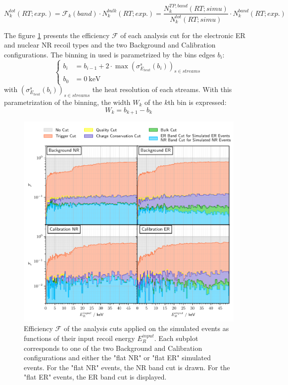 \begin{equation}
\label{eq:efficiency-correction}
N_k^{tot} (RT; exp.)
=
\mathcal{F}_k (band) \cdot N_k^{bulk} (RT; exp.)
=
\frac{ N_k^{TP, band} (RT; simu)}{ N_k^{tot} (RT; simu)} \cdot N_k^{band} (RT; exp.)
\end{equation}

The figure \ref{fig:cut-efficiency} presents the efficiency $\mathcal{F}$ of each analysis cut for the electronic ER and nuclear NR recoil types and the two Background and Calibration configurations. The binning in used is parametrized by the bins edges $b_i$:
\begin{equation}
\label{eq:bins-edges}
\begin{cases}
b_i &= b_{i-1} + 2 \cdot \max \left(\sigma_{E_{heat}}^s(b_i) \right)_{s \in streams}
\\
b_0 &= \SI{0}{\kilo\eV}
\end{cases}
\end{equation}
with $\left(\sigma_{E_{heat}}^s(b_i) \right)_{s \in streams}$ the heat resolution of each streams. With this parametrization of the binning, the width $W_k$ of the $k$th bin is expressed:
\begin{equation}
W_k = b_{k+1} - b_{k}
\end{equation}

\begin{figure}
\centering
\includegraphics[width=\linewidth,]{Figures/Neutron/cut_efficiency.pdf}
\caption{Efficiency $\mathcal{F}$ of the analysis cuts applied on the simulated events as functions of their input recoil energy $E_R^{input}$. Each subplot corresponds to one of the two Background and Calibration configurations and either the "flat NR" or "flat ER" simulated events. For the "flat NR" events, the NR band cut is drawn. For the "flat ER" events, the ER band cut is displayed.}
\label{fig:cut-efficiency}
\end{figure}

